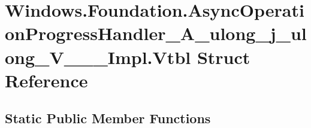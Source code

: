 \hypertarget{struct_windows_1_1_foundation_1_1_async_operation_progress_handler___a__ulong__j__ulong___v_______impl_1_1_vtbl}{}\section{Windows.\+Foundation.\+Async\+Operation\+Progress\+Handler\+\_\+\+A\+\_\+ulong\+\_\+j\+\_\+ulong\+\_\+\+V\+\_\+\+\_\+\+\_\+\+Impl.\+Vtbl Struct Reference}
\label{struct_windows_1_1_foundation_1_1_async_operation_progress_handler___a__ulong__j__ulong___v_______impl_1_1_vtbl}
\subsection*{Static Public Member Functions}
